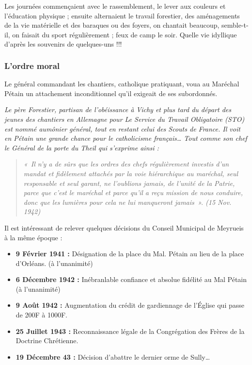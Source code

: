 Les journées commençaient avec le rassemblement, le lever aux couleurs et
l’éducation physique ; ensuite alternaient le travail forestier, des aménagements de la
vie matérielle et des baraques ou des foyers, on chantait beaucoup, semble-t-il, on
faisait du sport régulièrement ; feux de camp le soir.
Quelle vie idyllique d’après les souvenirs de quelques-uns !!!


\subsubsection{L’ordre moral}

Le général commandant les chantiers, catholique pratiquant, voua au Maréchal
Pétain un attachement inconditionnel qu’il exigeait de ses subordonnés.

\emph{Le père Forestier, partisan de l’obéissance à Vichy et plus tard du départ des
jeunes des chantiers en Allemagne pour Le Service du Travail Obligatoire (STO) est
nommé aumônier général, tout en restant celui des Scouts de France. Il voit en
Pétain une grande chance pour le catholicisme français… Tout comme son chef le
Général de la porte du Theil qui s’exprime ainsi :}

\begin{quote}
\emph{«~Il n’y a de sûrs que les ordres des chefs régulièrement investis d’un mandat et fidèlement attachés
par la voie hiérarchique au maréchal, seul responsable et seul garant, ne l’oublions jamais, de l’unité
de la Patrie, parce que c’est le maréchal et parce qu’il a reçu mission de nous conduire, donc que les
lumières pour cela ne lui manqueront jamais~». (15 Nov. 1942)}
\end{quote}

Il est intéressant de relever quelques décisions du Conseil Municipal de Meyrueis à la même époque :

\begin{itemize}
\item \textbf{9 Février 1941 :} Désignation de la place du Mal. Pétain au lieu de la place d’Orléans. (à l'unanimité)
\item \textbf{6 Décembre 1942 :} Inébranlable confiance et absolue fidélité au Mal Pétain (à l’unanimité)
\item \textbf{9 Août 1942 :} Augmentation du crédit de gardiennage de l’Église qui passe de 200F à 1000F.
\item \textbf{25 Juillet 1943 :} Reconnaissance légale de la Congrégation des Frères de la Doctrine Chrétienne.
\item \textbf{19 Décembre 43 :} Décision d’abattre le dernier orme de Sully…
\end{itemize}

